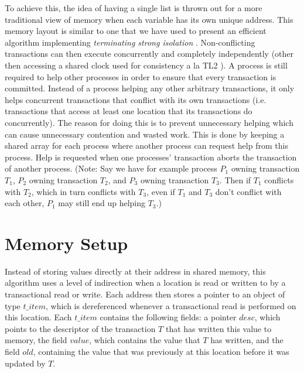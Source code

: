\documentclass[runningheads,a4paper]{llncs}
\begin{document}
To achieve this, the idea of having a single list is thrown out for a more traditional view of memory when each variable has its own
unique address.
This memory layout is similar to one that we have used to present an efficient algorithm implementing \emph{terminating strong isolation} \cite{CKR12}.
Non-conflicting transactions can then execute concurrently and completely independently (other then accessing a shared clock used for consistency a la TL2 \cite{dice06}).
A process is still required to help other processes in order to ensure that every transaction is committed.
Instead of a process helping any other arbitrary transactions, it only helps concurrent transactions that conflict with its own transactions (i.e. transactions
that access at least one location that its transactions do concurrently).
The reason for doing this is to prevent unnecessary helping which can cause unnecessary contention and wasted work.
This is done by keeping a shared array for each process where another process can request help from this process.
Help is requested when one processes' transaction aborts the transaction of another process.
(Note: Say we have for example process $P_1$ owning transaction $T_1$, $P_2$ owning transaction $T_2$, and $P_3$ owning transaction $T_3$.
Then if $T_1$ conflicts with $T_2$, which in turn conflicts with $T_3$, even if $T_1$ and $T_3$ don't conflict with each other, $P_1$ may
still end up helping $T_3$.)


\section{Memory Setup}
Instead of storing values directly at their address in shared memory, this algorithm
uses a level of indirection when a location is read or written to by a transactional read or write.
Each address then stores a pointer to an object of type $t\_item$, which is dereferenced
whenever a transactional read is performed on this location.
Each $\mathit{t\_item}$ contains the following fields:
a pointer $\mathit{desc}$, which points to the descriptor of the transaction $T$ that has written
this value to memory,
the field $\mathit{value}$, which contains the value that $T$ has written,
and the field $\mathit{old}$, containing the value that was previously at this location before
it was updated by $T$.
\end{document}
